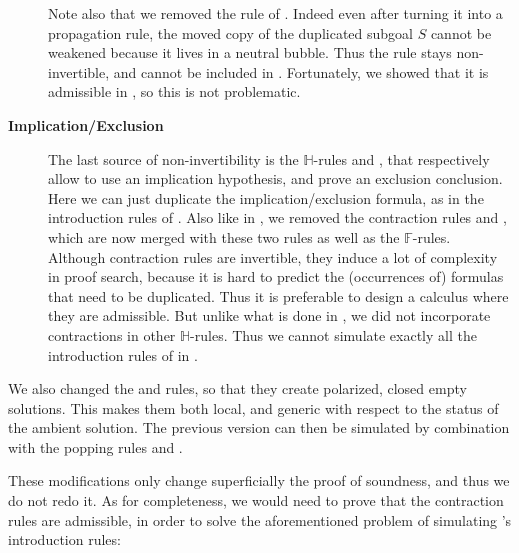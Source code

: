 \begin{description}
    Note also that we removed the  rule of .
    Indeed even after turning it into a propagation rule, the moved copy of the
    duplicated subgoal $S$ cannot be weakened because it lives in a neutral
    bubble. Thus the rule stays non-invertible, and cannot be included in
    . Fortunately, we showed that it is admissible in
    , so this is not problematic.

  \item[\textbf{Implication/Exclusion}]
    The last source of non-invertibility is the $\mathbb{H}$-rules
    \rsf{{\limp}{-}} and \rsf{{\lsub}{+}}, that respectively allow to use an
    implication hypothesis, and prove an exclusion conclusion.
    Here we can just duplicate the implication/exclusion formula, as in the
    introduction rules of . Also like in , we removed the
    contraction rules  and , which are now merged with these
    two rules as well as the $\mathbb{F}$-rules. Although contraction rules are
    invertible, they induce a lot of complexity in proof search, because it is
    hard to predict the (occurrences of) formulas that need to be duplicated. Thus
    it is preferable to design a calculus where they are admissible. But unlike
    what is done in , we did not incorporate contractions in other
    $\mathbb{H}$-rules. Thus we cannot simulate exactly all the introduction rules
    of  in .

\end{description}

\begin{remark}
  We also changed the \rsf{\bot{-}} and \rsf{\top{+}} rules, so that they create
  polarized, closed empty solutions. This makes them both local, and generic
  with respect to the status of the ambient solution. The previous version can
  then be simulated by combination with the popping rules  and
  .
\end{remark}

These modifications only change superficially the proof of soundness, and thus
we do not redo it. As for completeness, we would need to prove that the
contraction rules are admissible, in order to solve the aforementioned problem
of simulating 's introduction rules:

